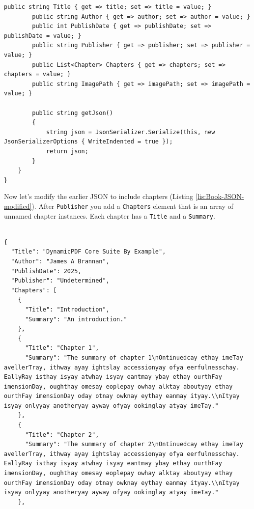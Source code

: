 \documentclass[american,letterpaper]{tufte-book}
\numberwithin{equation}{section}
\numberwithin{figure}{section}
\begin{document}
{{\begin{lstlisting}[caption={Modifying Book class to include a collection of Chapter class instances.},label={lis:Modifying-Book-class},basicstyle={\small\ttfamily},breaklines=true]
        public string Title { get => title; set => title = value; }
        public string Author { get => author; set => author = value; }
        public int PublishDate { get => publishDate; set => publishDate = value; }
        public string Publisher { get => publisher; set => publisher = value; }
        public List<Chapter> Chapters { get => chapters; set => chapters = value; }
        public string ImagePath { get => imagePath; set => imagePath = value; }

        public string getJson()
        {
            string json = JsonSerializer.Serialize(this, new JsonSerializerOptions { WriteIndented = true });
            return json;
        }
    }
}
\end{lstlisting}
\leavevmode\egroup

Now let's modify the earlier JSON to include chapters (Listing \ref{lis:Book-JSON-modified}).
After \texttt{Publisher} you add a \texttt{Chapters} element that
is an array of unnamed chapter instances. Each chapter has a \texttt{Title}
and a \texttt{Summary}.

\bgroup{}
\begin{lstlisting}[caption={Book JSON modified to include chapters.},label={lis:Book-JSON-modified},basicstyle={\small\ttfamily},breaklines=true]

{
  "Title": "DynamicPDF Core Suite By Example",
  "Author": "James A Brannan",
  "PublishDate": 2025,
  "Publisher": "Undetermined",
  "Chapters": [
    {
      "Title": "Introduction",
      "Summary": "An introduction."
    },
    {
      "Title": "Chapter 1",
      "Summary": "The summary of chapter 1\nOntinuedcay ethay imeTay avellerTray, ithway ayay ightslay accessionyay ofya eerfulnesschay. EallyRay isthay isyay atwhay isyay eantmay ybay ethay ourthFay imensionDay, oughthay omesay eoplepay owhay alktay aboutyay ethay ourthFay imensionDay oday otnay owknay eythay eanmay ityay.\\nItyay isyay onlyyay anotheryay ayway ofyay ookinglay atyay imeTay."
    },
    {
      "Title": "Chapter 2",
      "Summary": "The summary of chapter 2\nOntinuedcay ethay imeTay avellerTray, ithway ayay ightslay accessionyay ofya eerfulnesschay. EallyRay isthay isyay atwhay isyay eantmay ybay ethay ourthFay imensionDay, oughthay omesay eoplepay owhay alktay aboutyay ethay ourthFay imensionDay oday otnay owknay eythay eanmay ityay.\\nItyay isyay onlyyay anotheryay ayway ofyay ookinglay atyay imeTay."
    },


\end{lstlisting}}}
\end{document}
